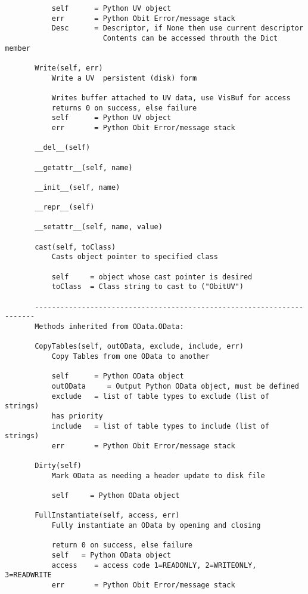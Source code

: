 \documentclass[11pt]{report}
\begin{document}
\begin{verbatim}
           self      = Python UV object
           err       = Python Obit Error/message stack
           Desc      = Descriptor, if None then use current descriptor
                       Contents can be accessed throuth the Dict member
       
       Write(self, err)
           Write a UV  persistent (disk) form
           
           Writes buffer attached to UV data, use VisBuf for access
           returns 0 on success, else failure
           self      = Python UV object
           err       = Python Obit Error/message stack
       
       __del__(self)
       
       __getattr__(self, name)
       
       __init__(self, name)
       
       __repr__(self)
       
       __setattr__(self, name, value)
       
       cast(self, toClass)
           Casts object pointer to specified class
           
           self     = object whose cast pointer is desired
           toClass  = Class string to cast to ("ObitUV")
       
       ----------------------------------------------------------------------
       Methods inherited from OData.OData:
       
       CopyTables(self, outOData, exclude, include, err)
           Copy Tables from one OData to another
           
           self      = Python OData object
           outOData     = Output Python OData object, must be defined
           exclude   = list of table types to exclude (list of strings)
           has priority
           include   = list of table types to include (list of strings)
           err       = Python Obit Error/message stack
       
       Dirty(self)
           Mark OData as needing a header update to disk file
           
           self     = Python OData object
       
       FullInstantiate(self, access, err)
           Fully instantiate an OData by opening and closing
           
           return 0 on success, else failure
           self   = Python OData object
           access    = access code 1=READONLY, 2=WRITEONLY, 3=READWRITE
           err       = Python Obit Error/message stack
       

\end{verbatim}
\end{document}
